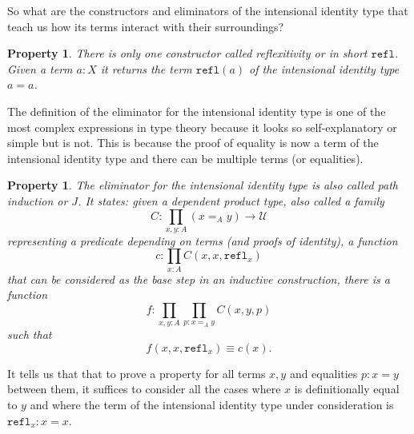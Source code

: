 \documentclass[12pt,a4paper,twoside,xetex,draft]{book}
\newcommand{\keyword}[1]{\emph{#1}\index{#1}}
\newtheorem{property}[theorem]{Property}
\newcommand{\op}[1]{\mathtt{#1}}
\begin{document}
 So what are the constructors and eliminators of the intensional identity type that teach us how its terms interact with their surroundings?

\begin{property}\label{reflprop}
There is only one constructor called \keyword{reflexitivity} or in short $\op{refl}$. Given a term $a:X$ it returns the term $\op{refl}(a)$ of the intensional identity type  $a = a$. 
\end{property}

The definition of the eliminator for the intensional identity type is one of the most complex expressions in type theory because it looks so self-explanatory or simple but is not. This is because the proof of equality is now a term of the intensional identity type and there can be multiple terms (or equalities). 

\begin{property}\label{pathindprop}
The eliminator for the intensional identity type is also called \keyword{path induction} or $J$. It states: given a dependent product type, also called a family
$$C : \prod_{x,y:A} (x =_A y) \rightarrow \mathcal{U}$$
representing a predicate depending on terms (and proofs of identity), a function $$c:\prod_{x:A} C(x,x,\op{refl}_x)$$ that can be considered as the base step in an inductive construction, there is a function $$f: \prod_{x,y:A} \prod_{p:x=_Ay}C(x,y,p)$$ such that $$f(x,x,\op{refl}_x) \equiv c(x).$$
\end{property}


It tells us that that to prove a property for all terms $x,y$ and equalities $p:x=y$ between them, it suffices to consider all the cases where $x$ is definitionally equal to $y$ and where the term of the intensional identity type under consideration is $\op{refl}_x : x = x$.




\end{document}
